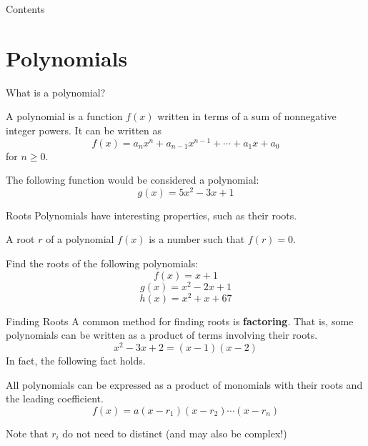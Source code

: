 \documentclass[aspectratio=169,xcolor=dvipsnames]{beamer}
\begin{document}
\begin{frame}[t]
  \titlepage
\end{frame}

\begin{frame}[t]{Contents}
  \tableofcontents
\end{frame}

\section{Polynomials}

\begin{frame}[t]{What is a polynomial?}
    \begin{definition}
        A polynomial is a function $f(x)$ written in terms of a sum of nonnegative integer powers. It can be written as
        \[f(x)=a_nx^n+a_{n-1}x^{n-1}+\cdots +a_1x+a_0\]
        for $n\ge0$.
    
    \end{definition}
    
    \vspace{0.5cm}
    
    The following function would be considered a polynomial:
    \[
    g(x)=5x^2-3x+1
    \]
\end{frame}

\begin{frame}[t]{Roots}
    Polynomials have interesting properties, such as their roots.
    
    \begin{definition}
        A root $r$ of a polynomial $f(x)$ is a number such that $f(r)=0$.
    \end{definition}
    
    Find the roots of the following polynomials:
    \[f(x)=x+1\]
    \[g(x)=x^2-2x+1\]
    \[h(x)=x^2+x+67\]
\end{frame}

\begin{frame}[t]{Finding Roots}
    A common method for finding roots is \textbf{factoring}. That is, some polynomials can be written as a product of terms involving their roots.
    \[
    x^2-3x+2=(x-1)(x-2)
    \]
    In fact, the following fact holds.

    \begin{theorem}
        All polynomials can be expressed as a product of monomials with their roots and the leading coefficient.
        \[f(x)=a(x-r_1)(x-r_2)\cdots(x-r_n)\]
    \end{theorem}

    \vspace{0.5cm}

    Note that \(r_i\) do not need to distinct (and may also be complex!)
\end{frame}
\end{document}
